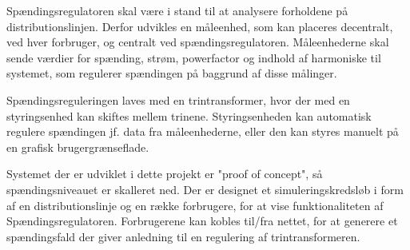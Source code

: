 

Spændingsregulatoren skal være i stand til at analysere forholdene på distributionslinjen. Derfor udvikles en måleenhed, som kan placeres decentralt, ved hver forbruger, og centralt ved spændingsregulatoren. Måleenhederne skal sende værdier for spænding, strøm, powerfactor og indhold af harmoniske til systemet, som regulerer spændingen på baggrund af disse målinger. 

Spændingsreguleringen laves med en trintransformer, hvor der med en styringsenhed kan skiftes mellem trinene. Styringsenheden kan automatisk regulere spændingen jf. data fra måleenhederne, eller den kan styres manuelt på en grafisk brugergrænseflade. 

Systemet der er udviklet i dette projekt er "proof of concept", så spændingsniveauet er skalleret ned.  Der er designet et simuleringskredsløb i form af en distributionslinje og en række forbrugere, for at vise funktionaliteten af Spændingsregulatoren. Forbrugerene  kan kobles til/fra nettet, for at generere et spændingsfald der giver anledning til en regulering af trintransformeren. 

